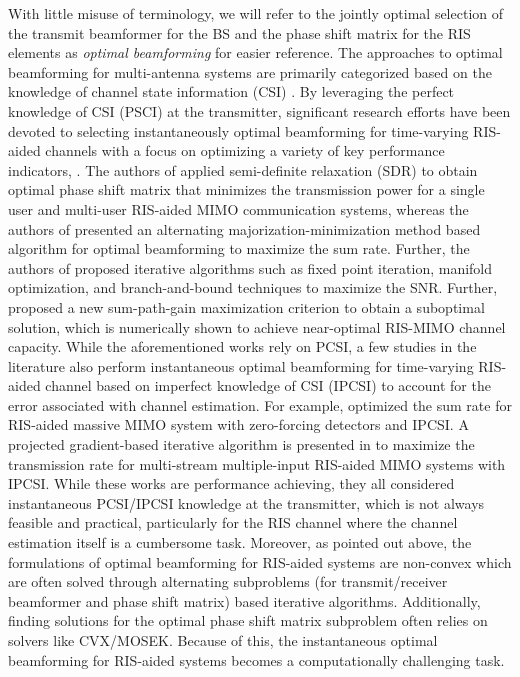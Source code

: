 \documentclass[journal,draftclsnofoot,onecolumn,12pt]{IEEEtran}
\begin{document}
With little misuse of terminology, we will refer to the jointly optimal selection of the transmit beamformer for the BS and the phase shift matrix for the RIS elements as {\em optimal beamforming} for easier reference. The approaches to optimal beamforming for multi-antenna systems are primarily categorized based on the knowledge of channel state information (CSI) \cite{Goldsmith_2003}. By leveraging the perfect knowledge of  CSI (PSCI) at the transmitter, significant research efforts have been devoted to selecting instantaneously optimal beamforming for time-varying RIS-aided channels with a focus on optimizing a variety of key performance indicators, \cite{WuQingqing_2019_PSCI_TxPow,HuangChongwen_2018_SR,YuXianghao_MISO_PSCI_2019,YuXianghao_MISO_PSCI_2020,NingBoyu_RISMIMO_PSCI_2020}. The authors of \cite{WuQingqing_2019_PSCI_TxPow} applied semi-definite relaxation (SDR) to obtain optimal phase shift matrix that minimizes the transmission power for a single user and multi-user RIS-aided MIMO communication systems, whereas the authors of \cite{HuangChongwen_2018_SR} presented an alternating  majorization-minimization method based algorithm for optimal beamforming to maximize the sum rate. Further, the authors of \cite{YuXianghao_MISO_PSCI_2019,YuXianghao_MISO_PSCI_2020} proposed iterative algorithms such as fixed point iteration, manifold optimization, and branch-and-bound techniques to maximize the {\rm SNR}. Further, \cite{NingBoyu_RISMIMO_PSCI_2020 } proposed a new sum-path-gain maximization criterion to obtain a  suboptimal solution, which is numerically shown to achieve near-optimal RIS-MIMO channel capacity.
While the aforementioned works rely on PCSI, a few studies in the literature also perform instantaneous optimal beamforming for time-varying RIS-aided channel based on imperfect knowledge of CSI (IPCSI) to account  for the error associated with channel estimation. For example,  \cite{ZhiKangda_2022_IPCSI} optimized the sum rate for RIS-aided massive MIMO system with zero-forcing detectors and IPCSI. A projected gradient-based iterative algorithm is presented in \cite{NemanjaStefan_2021_RateOpt_IPCSI} to maximize the transmission rate for  multi-stream multiple-input RIS-aided MIMO systems with IPCSI.
While these works are performance achieving, they all considered instantaneous PCSI/IPCSI knowledge at the transmitter, which is not always feasible and practical, particularly for the RIS channel where the channel estimation itself is a cumbersome task. Moreover, as pointed out above, the formulations of optimal beamforming for RIS-aided systems are non-convex which are often solved through alternating subproblems (for transmit/receiver beamformer and phase shift matrix) based iterative algorithms. Additionally, finding solutions for the optimal phase shift matrix subproblem often relies on solvers like CVX/MOSEK. Because of this, the instantaneous optimal beamforming for RIS-aided systems becomes a computationally challenging task.
\end{document}
